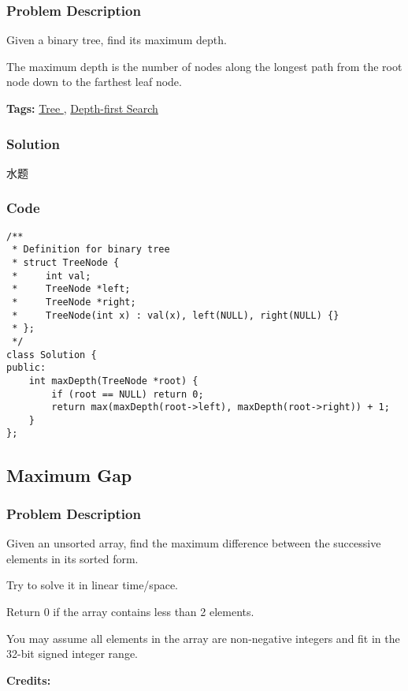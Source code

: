 \documentclass{article}
\begin{document}
\begin{CJK*}{UTF8}{gkai}
\subsubsection*{Problem Description}
Given a binary tree, find its maximum depth.

The maximum depth is the number of nodes along the longest path from the root node down to the farthest leaf node.


\textbf{Tags: }
\hyperref[ Tree ]{ Tree },  \hyperref[ Depth-first Search ]{ Depth-first Search }



\subsubsection*{Solution}
水题

\subsubsection*{Code}
\begin{lstlisting}
/**
 * Definition for binary tree
 * struct TreeNode {
 *     int val;
 *     TreeNode *left;
 *     TreeNode *right;
 *     TreeNode(int x) : val(x), left(NULL), right(NULL) {}
 * };
 */
class Solution {
public:
    int maxDepth(TreeNode *root) {
        if (root == NULL) return 0;
        return max(maxDepth(root->left), maxDepth(root->right)) + 1;
    }
}; 
\end{lstlisting}


\subsection{ Maximum Gap }
\label{ Maximum Gap }

\subsubsection*{Problem Description}
Given an unsorted array, find the maximum difference between the successive elements in its sorted form.

Try to solve it in linear time/space.

Return 0 if the array contains less than 2 elements.

You may assume all elements in the array are non-negative integers and fit in the 32-bit signed integer range.

\textbf{Credits:}


\end{CJK*}
\end{document}
